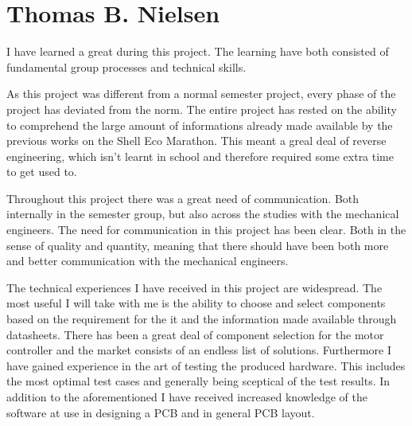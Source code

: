\section{Thomas B. Nielsen}
I have learned a great during this project. The learning have both consisted of fundamental group processes and technical skills. 

As this project was different from a normal semester project, every phase of the project has deviated from the norm.  The entire project has rested on the ability to comprehend the large amount of informations already made available by the previous works on the Shell Eco Marathon. This meant a greal deal of reverse engineering, which isn't learnt in school and therefore required some extra time to get used to. 

Throughout this project there was a great need of communication. Both internally in the semester group, but also across the studies with the mechanical engineers. The need for communication in this project has been clear. Both in the sense of quality and quantity, meaning that there should have been both more and better communication with the mechanical engineers. 

The technical experiences I have received in this project are widespread. The most useful I will take with me is the ability to choose and select components based on the requirement for the it and the information made available through datasheets. There has been a great deal of component selection for the motor controller and the market consists of an endless list of solutions. Furthermore I have gained experience in the art of testing the produced hardware. This includes the most optimal test cases and generally being sceptical of the test results. In addition to the aforementioned I have received increased knowledge of the software at use in designing a PCB and in general PCB layout. 